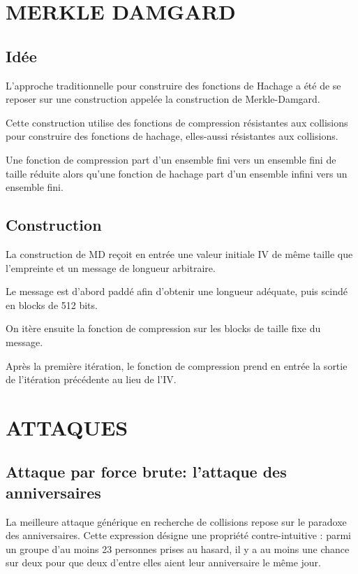 \documentclass[10.5pt, a4paper, twoside, openright]{report}
\begin{document}
\chapter{MERKLE DAMGARD}
\section{Idée}
L’approche traditionnelle pour construire des fonctions de Hachage a été de se reposer sur une construction appelée la construction de Merkle-Damgard.

Cette construction utilise des fonctions de compression résistantes aux collisions pour construire des fonctions de hachage, elles-aussi résistantes aux collisions.

Une fonction de compression part d’un ensemble fini vers un ensemble fini de taille réduite alors qu'une fonction de hachage part d’un ensemble infini vers un ensemble fini. 

\section{Construction}

La construction de MD reçoit en entrée une valeur initiale IV de même taille que l'empreinte et un message de longueur arbitraire.

Le message est d'abord paddé afin d'obtenir une longueur adéquate, puis scindé en blocks de 512 bits.

On itère ensuite la fonction de compression sur les blocks de taille fixe du message.

Après la première itération, le fonction de compression prend en entrée la sortie de l'itération précédente au lieu de l'IV.



\chapter{ATTAQUES}
\section{Attaque par force brute: l’attaque des anniversaires}
La meilleure attaque générique en recherche de collisions repose sur le paradoxe des anniversaires. Cette expression désigne une propriété contre-intuitive : parmi un groupe d’au moins 23 personnes prises au hasard, il y a au moins une chance sur deux pour que deux d’entre elles aient leur anniversaire le même jour. 
\end{document}
